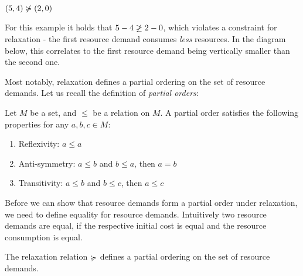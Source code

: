 \begin{example}
   \((5, 4) \notrelaxation (2, 0)\)

For this example it holds that \(5 - 4 \centernot{\geq} 2 - 0\), which violates a constraint for relaxation - the first resource demand consumes \emph{less} resources. In the diagram below, this correlates to the first resource demand being vertically smaller than the second one.


\end{example}

Most notably, relaxation defines a partial ordering on the set of resource demands. Let us recall the definition of \emph{partial orders}:

\begin{definition}
   Let \(M\) be a set, and \(\leq\) be a relation on \(M\). A partial order satisfies the following properties for any \(a, b, c \in M\):
   \begin{enumerate}[label=\Roman*]
      \item Reflexivity: \(a \leq a \) 
      \item Anti-symmetry: \(a \leq b\) and \(b \leq a\), then \(a = b\) 
      \item Transitivity: \(a \leq b\) and \(b \leq c\), then \(a \leq c\)
   \end{enumerate}
\end{definition}

Before we can show that resource demands form a partial order under relaxation, we need to define equality for resource demands. Intuitively two resource demands are equal, if the respective initial cost is equal and the resource consumption is equal. 

\begin{lemma}
   The relaxation relation \(\succcurlyeq\) defines a partial ordering on the set of resource demands.
\end{lemma}

